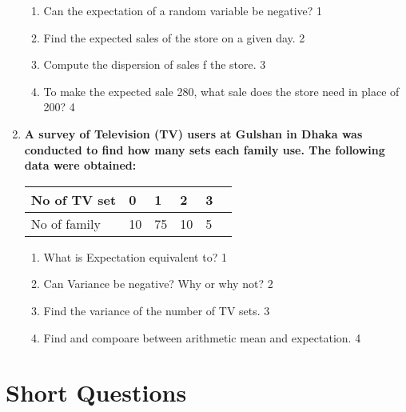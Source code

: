 \documentclass[a4paper,oneside, margin=1.4in]{book}
\begin{document}
\begin{enumerate}
  \begin{enumerate}
    \item
	Can the expectation of a random variable be negative? \hfill 1
    \item
    	Find the expected sales of the store on a given day. \hfill 2
    \item
    	Compute the dispersion of sales f the store. \hfill 3
     \item
     	To make the expected sale 280, what sale does the store need in place of 200? \hfill 4
  \end{enumerate}
  
     \item
	  \textbf{A survey of Television (TV) users at Gulshan in Dhaka was conducted to find how many sets each family use. The following data were obtained:} 
	  
	  	  \begin{table}[h]
	  \begin{center}
\begin{tabular}{llllll}
No of TV set    & 0 & 1  & 2 & 3    \\ \hline
No of family & 10 & 75 & 10 & 5
\end{tabular}
\end{center}	
\end{table}
  
  \begin{enumerate}
    \item
	What is Expectation equivalent to? \hfill 1
    \item
	Can Variance be negative? Why or why not? \hfill 2
    \item  
	Find the variance of the number of TV sets. \hfill 3
    \item
	Find and compoare between arithmetic mean and expectation. \hfill 4
  \end{enumerate}
  \end{enumerate}
  
\section{Short Questions}
\end{document}
